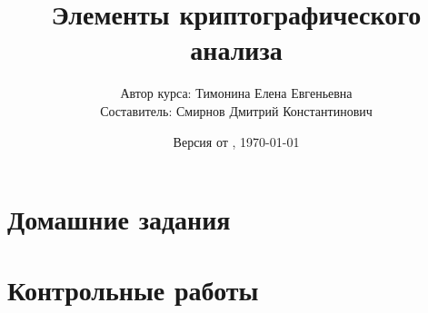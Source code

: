 \documentclass[letterpaper,11pt,openany]{book}
\title{Элементы криптографического анализа}
\author{Автор курса: Тимонина Елена Евгеньевна \\ 
		Составитель: Смирнов Дмитрий Константинович }
\date{Версия от \currenttime, \today}
\begin{document}
\maketitle
\tableofcontents

\mainmatter

\chapter{Домашние задания}







\newpage
\chapter{Контрольные работы}




\end{document}
